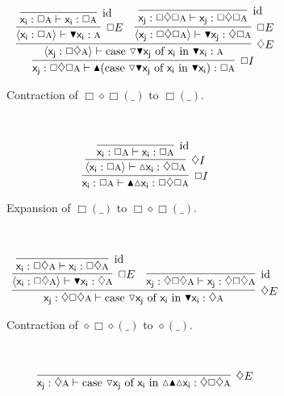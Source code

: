 \begin{figure}
	\centering
	\begin{subfigure}{1\textwidth}
		\[
			\infer[\Box I]{\term{x_j}: \Box\diamond\Box\prop{A} \vdash \boxintro(\caseof{\diaelim \boxelim x_j}{x_i }{\boxelim{x_i }}): \Box\prop{A}}{
				\infer[\diamond E]{\bracket{\term{x_j}: \Box\diamond \prop{A}} \vdash \caseof{\diaelim \boxelim x_j}{x_i }{\boxelim{x_i }}: \prop{A}}{
					\infer[\Box E]{\bracket{\term{x_i }: \Box \prop{A}} \vdash \term{\boxelim x_i }:\prop{A}}{
						\infer[\Ax]{\term{x_i }: \Box\prop{A} \vdash \term{x_i }: \Box\prop{A}}{}
					}
					&
					\infer[\Box E]{\bracket{\term{x_j}:\Box\diamond\Box\prop{A}} \vdash \term{\boxelim x_j}:\diamond\Box\prop{A}}{
						\infer[\Ax]{\term{x_j}: \Box\diamond\Box\prop{A}\vdash\term{x_j}:\Box\diamond\Box\prop{A}}{}
					}
				}
			}
		\]
		\caption{Contraction of $\Box\diamond\Box(\_)$ to $\Box(\_)$.}
		\label{subfigure:triple_law:box_collapse}
	\end{subfigure}\\[\midsep]
	\begin{subfigure}{1\textwidth}
		\[
			\infer[\Box I]{\term{x_i }:\Box\prop{A} \vdash \boxintro\diaintro\term{x_i }:\Box\diamond\Box\prop{A}}{
				\infer[\diamond I]{\bracket{\term{x_i }: \Box\prop{A}} \vdash \diaintro\term{x_i }:\diamond\Box\prop{A}}{
					\infer[\Ax]{\term{x_i }:\Box\prop{A}\vdash \term{x_i }:\Box\prop{A}}{}
				}
			}
		\]
		\caption{Expansion of $\Box(\_)$ to $\Box\diamond\Box(\_)$.}
		\label{subfigure:triple_law:box_expand}
	\end{subfigure}\\[\midsep]
	\begin{subfigure}{1\textwidth}
		\[
			\infer[\diamond E]{\term{x_j}:\diamond\Box\diamond\prop{A} \vdash \caseof{\diaelim x_j}{x_i }{\boxelim x_i }: \diamond\prop{A}}{
				\infer[\Box E]{\bracket{\term{x_i }: \Box\diamond\prop{A}} \vdash \boxelim\term{x_i }: \diamond\prop{A}}{
					\infer[\Ax]{\term{x_i }: \Box\diamond\prop{A} \vdash \term{x_i }: \Box\diamond\prop{A}}{}
				}
				&
				\infer[\Ax]{\term{x_j}: \diamond\Box\diamond\prop{A} \vdash \term{x_j}: \diamond\Box\diamond\prop{A}}{}
			}
		\]
		\caption{Contraction of $\diamond\Box\diamond(\_)$ to $\diamond(\_)$.}
		\label{subfigure:triple_law:diamond_collapse}
	\end{subfigure}\\[\midsep]
	\begin{subfigure}{1\textwidth}
		\[
			\infer[\diamond E]{\term{x_j}: \diamond \prop{A} \vdash \caseof{\diaelim x_j}{x_i }{\diaintro\boxintro\diaintro x_i }:\diamond\Box\diamond\prop{A}}{
}\]
\end{subfigure}
\end{figure}
